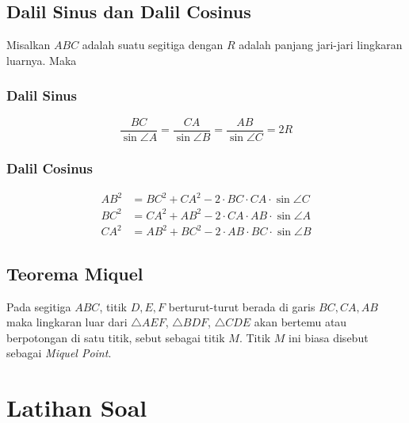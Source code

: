 \documentclass[11pt]{scrartcl}
\begin{document}
    \subsection{Dalil Sinus dan Dalil Cosinus}
        Misalkan $ABC$ adalah suatu segitiga dengan $R$ adalah panjang jari-jari lingkaran luarnya. Maka
        \subsubsection{Dalil Sinus}
        $$\dfrac{BC}{\sin \angle A} = \dfrac{CA}{\sin \angle B}= \dfrac{AB}{\sin \angle C} = 2R$$
        
        \subsubsection{Dalil Cosinus}
        \begin{align*}
            AB^2 &= BC^2 + CA^2 - 2\cdot BC \cdot CA \cdot \sin \angle C\\
            BC^2 &= CA^2 + AB^2 - 2\cdot CA \cdot AB \cdot \sin \angle A\\
            CA^2 &= AB^2 + BC^2 - 2\cdot AB \cdot BC \cdot \sin \angle B
        \end{align*}
        
        
    \subsection{Teorema Miquel}
        Pada segitiga $ABC$, titik $D,E,F$ berturut-turut berada di garis $BC,CA,AB$ maka lingkaran luar dari $\triangle AEF$, $\triangle  BDF$, $\triangle CDE$ akan bertemu atau berpotongan di satu titik, sebut sebagai titik $M$. Titik $M$ ini biasa disebut sebagai \textit{Miquel Point}.
        
    \section{Latihan Soal}
\end{document}
